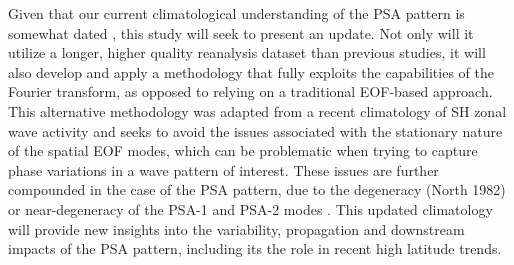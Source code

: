 Given that our current climatological understanding of the PSA pattern is somewhat dated \citep{Mo1998,Mo2001}, this study will seek to present an update. Not only will it utilize a longer, higher quality reanalysis dataset than previous studies, it will also develop and apply a methodology that fully exploits the capabilities of the Fourier transform, as opposed to relying on a traditional EOF-based approach. This alternative methodology was adapted from a recent climatology of SH zonal wave activity \citep{IrvingSimmonds2015} and seeks to avoid the issues associated with the stationary nature of the spatial EOF modes, which can be problematic when trying to capture phase variations in a wave pattern of interest. These issues are further compounded in the case of the PSA pattern, due to the degeneracy (North 1982) or near-degeneracy of the PSA-1 and PSA-2 modes \citep[e.g.][]{Mo2000}. This updated climatology will provide new insights into the variability, propagation and downstream impacts of the PSA pattern, including its the role in recent high latitude trends. 

